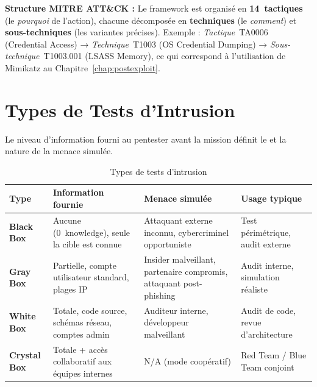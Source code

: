 \begin{boxinfo}
\textbf{Structure MITRE ATT\&CK :} Le framework est organisé en
\textbf{14~tactiques} (le \textit{pourquoi} de l'action), chacune
décomposée en \textbf{techniques} (le \textit{comment}) et
\textbf{sous-techniques} (les variantes précises). Exemple :
\textit{Tactique}~TA0006 (Credential Access) →
\textit{Technique}~T1003 (OS Credential Dumping) →
\textit{Sous-technique}~T1003.001 (LSASS Memory), ce qui correspond
à l'utilisation de Mimikatz au Chapitre~\ref{chap:postexploit}.
\end{boxinfo}

\section{Types de Tests d'Intrusion}
\label{sec:types_tests}

Le niveau d'information fourni au pentester avant la mission définit le
 et la nature de la menace simulée.

\begin{table}[htbp]
\centering
\caption{Types de tests d'intrusion}
\label{tab:types_tests}
\begin{tabular}{p{2.2cm}p{3.8cm}p{3.8cm}p{3cm}}
\toprule
\textbf{Type}
    & \textbf{Information fournie}
    & \textbf{Menace simulée}
    & \textbf{Usage typique} \\
\midrule
\textbf{Black Box}
    & Aucune (0~knowledge), seule la cible est connue
    & Attaquant externe inconnu, cybercriminel opportuniste
    & Test périmétrique, audit externe \\
\addlinespace
\textbf{Gray Box}
    & Partielle, compte utilisateur standard, plages IP
    & Insider malveillant, partenaire compromis, attaquant post-phishing
    & Audit interne, simulation réaliste \\
\addlinespace
\textbf{White Box}
    & Totale, code source, schémas réseau, comptes admin
    & Auditeur interne, développeur malveillant
    & Audit de code, revue d'architecture \\
\addlinespace
\textbf{Crystal Box}
    & Totale + accès collaboratif aux équipes internes
    & N/A (mode coopératif)
    & Red Team / Blue Team conjoint \\
\bottomrule
\end{tabular}
\end{table}


